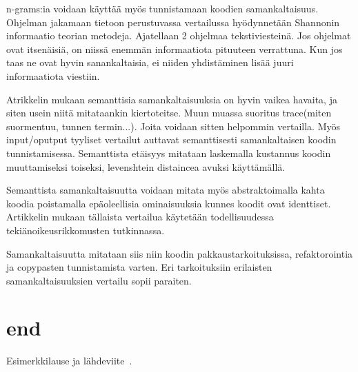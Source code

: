 \documentclass[finnish]{tktltiki2}
\theoremstyle{definition}
\theoremstyle{remark}
\begin{document}
n-grams:ia voidaan käyttää myös tunnistamaan koodien samankaltaisuus.
Ohjelman jakamaan tietoon perustuvassa vertailussa hyödynnetään Shannonin informaatio teorian metodeja. Ajatellaan 2 ohjelmaa tekstiviesteinä. Jos ohjelmat ovat itsenäisiä, on niissä enemmän informaatiota pituuteen verrattuna. Kun jos taas ne ovat hyvin sanankaltaisia, ei niiden yhdistäminen lisää juuri informaatiota viestiin.


Atrikkelin mukaan semanttisia samankaltaisuuksia on hyvin vaikea havaita, ja siten usein niitä mitataankin kiertoteitse. Muun muassa suoritus trace(miten suormentuu, tunnen termin...). Joita voidaan sitten helpommin vertailla. Myös input/oputput tyyliset vertailut auttavat semanttisesti samankaltaisen koodin tunnistamisessa. Semanttista etäisyys mitataan laskemalla kustannus koodin muuttamiseksi toiseksi, levenshtein distaincea avuksi käyttämällä.

Semanttista samankaltaisuutta voidaan mitata myös abstraktoimalla kahta koodia poistamalla epäoleellisia ominaisuuksia kunnes koodit ovat identtiset. Artikkelin mukaan tällaista vertailua käytetään todellisuudessa tekiänoikeusrikkomusten tutkinnassa.

Samankaltaisuutta mitataan siis niin koodin pakkaustarkoituksissa, refaktorointia ja copypasten tunnistamista varten. Eri tarkoituksiin erilaisten samankaltaisuuksien vertailu sopii paraiten. 


\section{end}
Esimerkkilause ja lähdeviite~\cite{esimerkki}.


%
%
% 
%







% 
\end{document}
